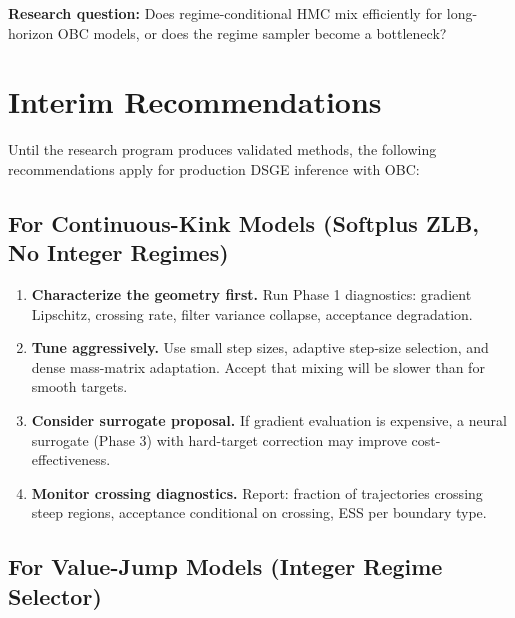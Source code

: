 \textbf{Research question:} Does regime-conditional HMC mix efficiently for
long-horizon OBC models, or does the regime sampler become a bottleneck?

\section{Interim Recommendations}

Until the research program produces validated methods, the following
recommendations apply for production DSGE inference with OBC:

\subsection{For Continuous-Kink Models (Softplus ZLB, No Integer Regimes)}

\begin{enumerate}
  \item \textbf{Characterize the geometry first.} Run Phase 1 diagnostics:
    gradient Lipschitz, crossing rate, filter variance collapse, acceptance
    degradation.
  \item \textbf{Tune aggressively.} Use small step sizes, adaptive step-size
    selection, and dense mass-matrix adaptation. Accept that mixing will be
    slower than for smooth targets.
  \item \textbf{Consider surrogate proposal.} If gradient evaluation is
    expensive, a neural surrogate (Phase 3) with hard-target correction may
    improve cost-effectiveness.
  \item \textbf{Monitor crossing diagnostics.} Report: fraction of trajectories
    crossing steep regions, acceptance conditional on crossing, ESS per
    boundary type.
\end{enumerate}

\subsection{For Value-Jump Models (Integer Regime Selector)}

